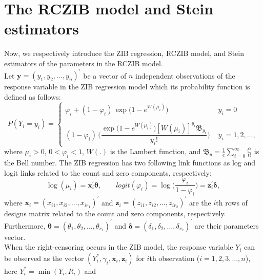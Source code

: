 \documentclass[twoside]{article}
\begin{document}
\section{The RCZIB model and Stein estimators}
Now, we respectively introduce the ZIB regression, RCZIB model, and Stein estimators of the parameters in the RCZIB model.
\\
Let 
$ \boldsymbol{y} = ( y_1, y_2, \dots , y_n )^\prime $
be a vector of 
$ n $
independent observations of the response variable in the ZIB regression model which its probability function is defined as follows:
\begin{equation}\label{e 4}
P( Y_i = y_i )=\left\{ 
\begin{array}{ll}
\varphi_i + (1-\varphi_i) \, \exp{ \big ( 1 - e^{ W ( \mu_i ) }   \big )} &  \, \, y_i = 0 \\
& \\
(1  -  \varphi_i) \, \Big (  \dfrac{  \exp{ \big ( 1 - e^{ W ( \mu_i ) }   \big )  [ W ( \mu_i ) ]^{y_i} \mathfrak{B}_{y_i} }}{ y_i ! }  \Big )  & \, \,  y_i  = 1, 2, \dots ,
\end{array} \right.
\end{equation}
where 
$ \mu_i > 0 $,
$ 0 < \varphi_i < 1 $,
$ W ( . ) $
is the Lambert function, and
$ \mathfrak{B}_y = \frac{1}{e} \sum_{t = 0}^{ \infty } \frac{t^y}{t!} $
is the Bell number. The ZIB regression has two following link functions as log and logit links related to the count and zero components, respectively:
\begin{equation*}\label{e 5}
\log{ ( \mu_i ) } = \boldsymbol{x}^\prime_i \boldsymbol{\theta} , \qquad
logit ( \varphi_i ) = \log {  \big( \frac{ \varphi_i }{ 1 - \varphi_i  } \big ) } = \boldsymbol{z}^\prime_i \boldsymbol{\delta} ,
\end{equation*}
where
$ \boldsymbol{x}_i = ( x_{i1}, x_{i2}, \dots, x_{ ir_1 } )^\prime $
and
$ \boldsymbol{z}_i = ( z_{i1}, z_{i2}, \dots, z_{ ir_2 } )^\prime $
are the 
$ i $th
rows of designs matrix related to the count and zero components, respectively. Furthermore, 
$ \boldsymbol{\theta} = ( \theta_1, \theta_2, \dots, \theta_{r_1} )^\prime $
and
$ \boldsymbol{\delta} = ( \delta_1, \delta_2, \dots, \delta_{r_2} )^\prime $
are their parameters vector. 
\\
When the right-censoring occurs in the ZIB model, the response variable 
$ Y_i $
can be observed as the vector 
$ ( Y_i^*, \gamma_i , \boldsymbol{x}_i , \boldsymbol{z}_i ) $
for 
$ i $th
observation 
($ i = 1, 2, 3, \dots, n $),
here
$ Y_i^*  = \min{ ( Y_i, R_i ) } $ 
and 
\end{document}
